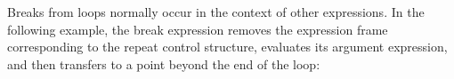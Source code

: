 \begin{center}
\tabletail{}
\tablelasttail{}
\begin{supertabular}{|m{1.9073598in}|m{2.75596in}|}

\end{supertabular}
\end{center}

Breaks from loops normally occur in the context of other
expressions. In the following example, the break expression removes
the expression frame corresponding to the repeat control structure,
evaluates its argument expression, and then transfers to a point
beyond the end of the loop:

